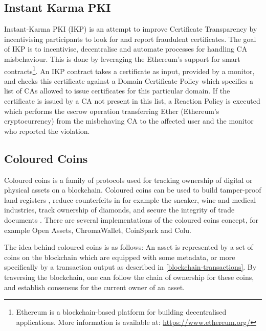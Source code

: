 \documentclass{style/kththesis}
\begin{document}
\subsection{Instant Karma PKI}
Instant-Karma PKI (IKP) \cite{Matsumoto16} is an attempt to improve Certificate Transparency by incentivising participants to look for and report fraudulent certificates. The goal of IKP is to incentivise, decentralise and automate processes for handling CA misbehaviour. This is done by leveraging the Ethereum's support for smart contracts\footnote{Ethereum is a blockchain-based platform for building decentralised applications. More information is available at: \url{https://www.ethereum.org/}}. An IKP contract takes a certificate as input, provided by a monitor, and checks this certificate against a Domain Certificate Policy which specifies a list of CAs allowed to issue certificates for this particular domain. If the certificate is issued by a CA not present in this list, a Reaction Policy is executed which performs the escrow operation transferring Ether (Ethereum's cryptocurrency) from the misbehaving CA to the affected user and the monitor who reported the violation.

\subsection{Coloured Coins}
Coloured coins is a family of protocols used for tracking ownership of digital or physical assets on a blockchain. Coloured coins can be used to build tamper-proof land registers \cite{Lantmateriet16}, reduce counterfeits in for example the sneaker, wine and medical industries, track ownership of diamonds, and secure the integrity of trade documents \cite{Infosys16}. There are several implementations of the coloured coins concept, for example Open Assets, ChromaWallet, CoinSpark and Colu.

The idea behind coloured coins is as follows: An asset is represented by a set of coins on the blockchain which are equipped with some metadata, or more specifically by a transaction output as described in \cref{blockchain-transactions}. By traversing the blockchain, one can follow the chain of ownership for these coins, and establish consensus for the current owner of an asset.
\end{document}
